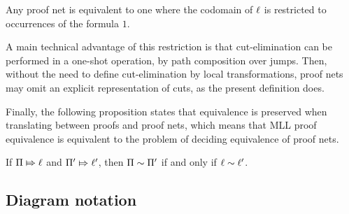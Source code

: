 \documentclass{lmcs}
\let\capsabbrev=\uppercase
\begin{document}
\begin{proposition}
Any proof net is equivalent to one where the codomain of $\ell$ is restricted to occurrences of the formula $1$.
\end{proposition}

A main technical advantage of this restriction is that cut-elimination can be performed in a one-shot operation, by path composition over jumps. Then, without the need to define cut-elimination by local transformations, proof nets may omit an explicit representation of cuts, as the present definition does.

Finally, the following proposition states that equivalence is preserved when translating between proofs and proof nets, which means that \capsabbrev{mll} proof equivalence is equivalent to the problem of deciding equivalence of proof nets.


\begin{proposition}
\label{prop:proof nets work}
%
If $\Pi\Mapsto\ell$ and $\Pi'\Mapsto\ell'$, then $\Pi\perm\Pi'$ if and only if $\links\perm\links'$.
%
\end{proposition}




\subsection*{Diagram notation}
\end{document}
